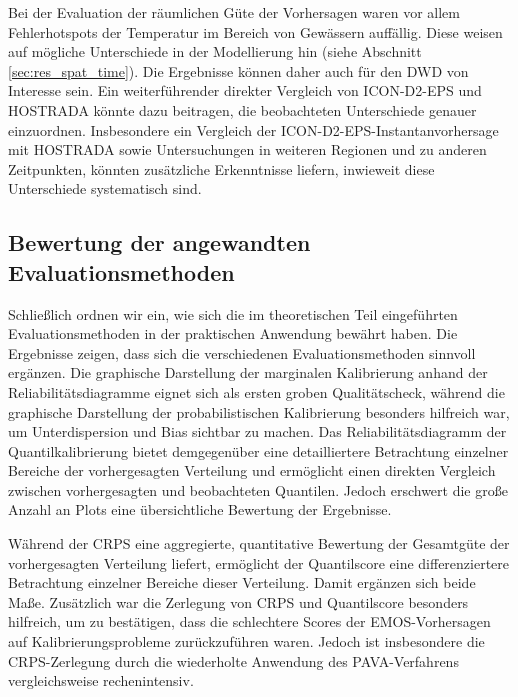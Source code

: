 Bei der Evaluation der räumlichen Güte der Vorhersagen waren vor allem Fehlerhotspots der Temperatur im Bereich von Gewässern auffällig. Diese weisen auf mögliche Unterschiede in der Modellierung hin (siehe Abschnitt \ref{sec:res_spat_time}). Die Ergebnisse können daher auch für den DWD von Interesse sein. Ein weiterführender direkter Vergleich von ICON-D2-EPS und HOSTRADA könnte dazu beitragen, die beobachteten Unterschiede genauer einzuordnen. Insbesondere ein Vergleich der ICON-D2-EPS-Instantanvorhersage mit HOSTRADA sowie Untersuchungen in weiteren Regionen und zu anderen Zeitpunkten, könnten zusätzliche Erkenntnisse liefern, inwieweit diese Unterschiede systematisch sind.


\subsection{Bewertung der angewandten Evaluationsmethoden}

Schließlich ordnen wir ein, wie sich die im theoretischen Teil eingeführten Evaluationsmethoden in der praktischen Anwendung bewährt haben. Die Ergebnisse zeigen, dass sich die verschiedenen Evaluationsmethoden sinnvoll ergänzen. Die graphische Darstellung der marginalen Kalibrierung anhand der Reliabilitätsdiagramme eignet sich als ersten groben Qualitätscheck, während die graphische Darstellung der probabilistischen Kalibrierung besonders hilfreich war, um Unterdispersion und Bias sichtbar zu machen. Das Reliabilitätsdiagramm der Quantilkalibrierung bietet demgegenüber eine detailliertere Betrachtung einzelner Bereiche der vorhergesagten Verteilung und ermöglicht einen direkten Vergleich zwischen vorhergesagten und beobachteten Quantilen. Jedoch erschwert die große Anzahl an Plots eine übersichtliche Bewertung der Ergebnisse.

Während der CRPS eine aggregierte, quantitative Bewertung der Gesamtgüte der vorhergesagten Verteilung liefert, ermöglicht der Quantilscore eine differenziertere Betrachtung einzelner Bereiche dieser Verteilung. Damit ergänzen sich beide Maße. Zusätzlich war die Zerlegung von CRPS und Quantilscore besonders hilfreich, um zu bestätigen, dass die schlechtere Scores der EMOS-Vorhersagen auf Kalibrierungsprobleme zurückzuführen waren. Jedoch ist insbesondere die CRPS-Zerlegung durch die wiederholte Anwendung des PAVA-Verfahrens vergleichsweise rechenintensiv. 


